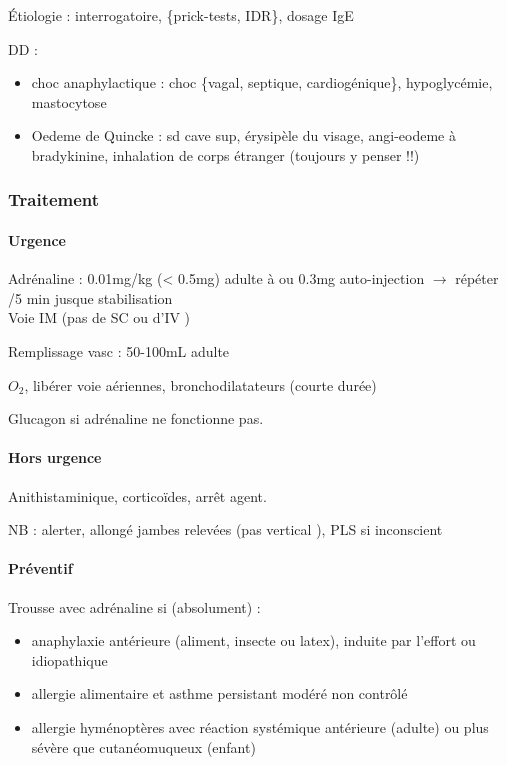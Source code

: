 \documentclass[11pt]{article}
\begin{document}
Étiologie : interrogatoire, \{prick-tests, IDR\}, dosage IgE

DD : 

\begin{itemize}
\item choc anaphylactique : choc \{vagal, septique, cardiogénique\}, hypoglycémie, mastocytose
\item Oedeme de Quincke : sd cave sup, érysipèle du visage, angi-eodeme à
bradykinine, inhalation de corps étranger (toujours y penser !!)
\end{itemize}


\subsubsection{Traitement}
\label{sec:org7095494}
\paragraph{Urgence}
\label{sec:org35a1ba1}
Adrénaline : 0.01mg/kg (< 0.5mg) adulte à \faHospitalO{} ou  0.3mg
auto-injection \(\rightarrow\) répéter /5 min jusque stabilisation\\
Voie IM (pas de SC ou d'IV \danger{})

Remplissage vasc : 50-100mL adulte

\(O_2\), libérer voie aériennes, bronchodilatateurs (courte durée)

Glucagon si adrénaline ne fonctionne pas. 

\paragraph{Hors urgence}
\label{sec:orgd4af56c}
Anithistaminique, corticoïdes, arrêt agent.

NB : alerter, allongé jambes relevées (pas vertical \danger{} \faBomb), PLS si
inconscient

\paragraph{Préventif}
\label{sec:org8b46cae}
Trousse avec adrénaline si (absolument) :

\begin{itemize}
\item anaphylaxie antérieure (aliment, insecte ou latex), induite par l'effort
ou idiopathique
\item allergie alimentaire et asthme persistant modéré non contrôlé
\item allergie hyménoptères avec réaction systémique antérieure (adulte) ou
plus sévère que cutanéomuqueux (enfant)
\end{itemize}
\end{document}
